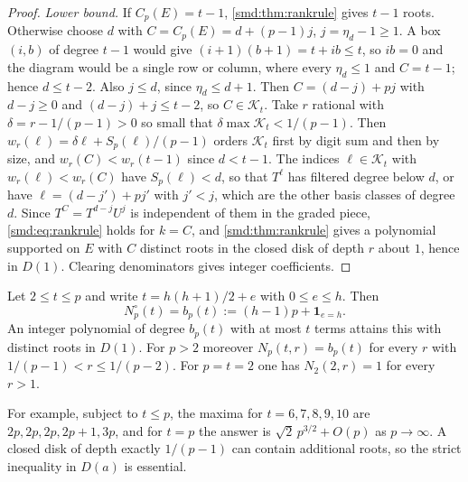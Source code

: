 \begin{proof}
\emph{Lower bound.} If $C_p(E)=t-1$, \cref{smd:thm:rankrule} gives $t-1$ roots. Otherwise
choose $d$ with $C=C_p(E)=d+(p-1)j$, $j=\eta_d-1\ge1$. A box $(i,b)$ of degree $t-1$
would give $(i+1)(b+1)=t+ib\le t$, so $ib=0$ and the diagram would be a single row or
column, where every $\eta_d\le1$ and $C=t-1$; hence $d\le t-2$. Also $j\le d$, since
$\eta_d\le d+1$. Then $C=(d-j)+pj$ with $d-j\ge0$ and $(d-j)+j\le t-2$, so
$C\in\mathcal K_t$. Take $r$ rational with $\delta=r-1/(p-1)>0$ so small that
$\delta\max\mathcal K_t<1/(p-1)$. Then
$w_r(\ell)=\delta\ell+S_p(\ell)/(p-1)$ orders $\mathcal K_t$ first by digit sum and then
by size, and $w_r(C)<w_r(t-1)$ since $d<t-1$. The indices $\ell\in\mathcal K_t$ with
$w_r(\ell)<w_r(C)$ have $S_p(\ell)<d$, so that $T^\ell$ has filtered degree below $d$, or
have $\ell=(d-j')+pj'$ with $j'<j$, which are the other basis classes of degree $d$. Since
$T^C=T^{d-j}U^j$ is independent of them in the graded piece, \eqref{smd:eq:rankrule}
holds for $k=C$, and \cref{smd:thm:rankrule} gives a polynomial supported on $E$ with $C$
distinct roots in the closed disk of depth $r$ about $1$, hence in $D(1)$. Clearing
denominators gives integer coefficients.
\end{proof}

\begin{theorem}\label{smd:thm:opendisk}
Let $2\le t\le p$ and write $t=h(h+1)/2+e$ with $0\le e\le h$. Then
\[
 N^\circ_p(t)=b_p(t):=(h-1)p+\mathbf 1_{e=h}.
\]
An integer polynomial of degree $b_p(t)$ with at most $t$ terms attains this with distinct
roots in $D(1)$. For $p>2$ moreover $N_p(t,r)=b_p(t)$ for every $r$ with
$1/(p-1)<r\le1/(p-2)$. For $p=t=2$ one has $N_2(2,r)=1$ for every $r>1$.
\end{theorem}

For example, subject to $t\le p$, the maxima for $t=6,7,8,9,10$ are $2p,2p,2p,2p+1,3p$,
and for $t=p$ the answer is $\sqrt2\,p^{3/2}+O(p)$ as $p\to\infty$. A closed disk of depth
exactly $1/(p-1)$ can contain additional roots, so the strict inequality in $D(a)$ is
essential.


